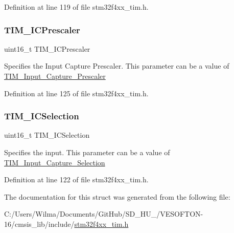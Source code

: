 Definition at line 119 of file stm32f4xx\+\_\+tim.\+h.

\mbox{\label{struct_t_i_m___i_c_init_type_def_abdff50beb0809a640ccf2cebde439a00}} 
\subsubsection{\texorpdfstring{T\+I\+M\+\_\+\+I\+C\+Prescaler}{TIM\_ICPrescaler}}
{\footnotesize\ttfamily uint16\+\_\+t T\+I\+M\+\_\+\+I\+C\+Prescaler}

Specifies the Input Capture Prescaler. This parameter can be a value of \hyperlink{group___t_i_m___input___capture___prescaler}{T\+I\+M\+\_\+\+Input\+\_\+\+Capture\+\_\+\+Prescaler} 

Definition at line 125 of file stm32f4xx\+\_\+tim.\+h.

\mbox{\label{struct_t_i_m___i_c_init_type_def_a052908740c8c618054ef82b3ec89e9b3}} 
\subsubsection{\texorpdfstring{T\+I\+M\+\_\+\+I\+C\+Selection}{TIM\_ICSelection}}
{\footnotesize\ttfamily uint16\+\_\+t T\+I\+M\+\_\+\+I\+C\+Selection}

Specifies the input. This parameter can be a value of \hyperlink{group___t_i_m___input___capture___selection}{T\+I\+M\+\_\+\+Input\+\_\+\+Capture\+\_\+\+Selection} 

Definition at line 122 of file stm32f4xx\+\_\+tim.\+h.



The documentation for this struct was generated from the following file\+:\begin{DoxyCompactItemize}
\item 
C\+:/\+Users/\+Wilma/\+Documents/\+Git\+Hub/\+S\+D\+\_\+\+H\+U\+\_/\+V\+E\+S\+O\+F\+T\+O\+N-\/16/cmsis\+\_\+lib/include/\hyperlink{stm32f4xx__tim_8h}{stm32f4xx\+\_\+tim.\+h}\end{DoxyCompactItemize}
